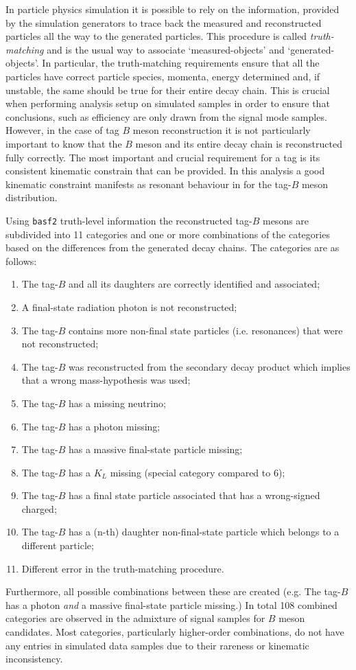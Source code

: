 In particle physics simulation it is possible to rely on the information, provided by the simulation generators to trace back the measured and reconstructed particles all the way to the generated particles.
This procedure is called \textit{truth-matching} and is the usual way to associate `measured-objects' and `generated-objects'.
In particular, the truth-matching requirements ensure that all the particles have correct particle species, momenta, energy determined and, if unstable, the same should be true for their entire decay chain.
This is crucial when performing analysis setup on simulated samples in order to ensure that conclusions, such as efficiency are only drawn from the signal mode samples.
However, in the case of tag $B$ meson reconstruction it is not particularly important to know that the $B$ meson and its entire decay chain is reconstructed fully correctly.
The most important and crucial requirement for a tag is its consistent kinematic constrain that can be provided.
In this analysis a good kinematic constraint manifests as resonant behaviour in \Mbc for the tag-$B$ meson distribution.

Using \texttt{basf2} truth-level information the reconstructed tag-$B$ mesons are subdivided into 11 categories and one or more combinations of the categories based on the differences from the generated decay chains.
The categories are as follows:
\begin{enumerate}
    \setcounter{enumi}{0}
    \item The tag-$B$ and all its daughters are correctly identified and associated;
    \item A final-state radiation photon is not reconstructed;
    \item The tag-$B$ contains more non-final state particles (i.e. resonances) that were not reconstructed;
    \item The tag-$B$ was reconstructed from the secondary decay product which implies that a wrong mass-hypothesis was used;
    \item The tag-$B$ has a missing neutrino;
    \item The tag-$B$ has a photon missing;
    \item The tag-$B$ has a massive final-state particle missing;
    \item The tag-$B$ has a $K_L$ missing (special category compared to 6);
    \item The tag-$B$ has a final state particle associated that has a wrong-signed charged;
    \item The tag-$B$ has a (n-th) daughter non-final-state particle which belongs to a different particle;
    \item Different error in the truth-matching procedure.
\end{enumerate}
Furthermore, all possible combinations between these are created (e.g. The tag-$B$ has a photon \textit{and} a massive final-state particle missing.)
In total 108 combined categories are observed in the admixture of \BtoXsgamma signal \MC samples for $B$ meson candidates.
Most categories, particularly higher-order combinations, do not have any entries in simulated data samples due to their rareness or kinematic inconsistency.

